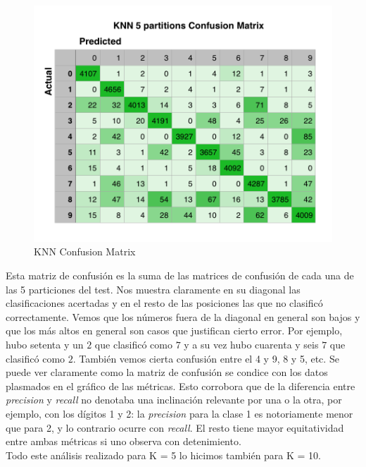 \begin{figure}[h!]
  \begin{center}
	\includegraphics[scale=0.7]{exp1/KNN-5p-Confusion.png}
	\caption{KNN Confusion Matrix}
  \end{center}
\end{figure}

Esta matriz de confusión es la suma de las matrices de confusión de cada una de las 5 particiones del test. Nos muestra claramente en su diagonal las clasificaciones acertadas y en el resto de las posiciones las que no clasificó correctamente. Vemos que los números fuera de la diagonal en general son bajos y que los más altos en general son casos que justifican cierto error. Por ejemplo, hubo setenta y un $2$ que clasificó como $7$ y a su vez hubo cuarenta y seis $7$ que clasificó como $2$. También vemos cierta confusión entre el 4 y 9, 8 y 5, etc. Se puede ver claramente como la matriz de confusi\'on se condice con los datos plasmados en el gr\'afico de las m\'etricas. Esto corrobora que de la diferencia entre \textit{precision} y \textit{recall} no denotaba una inclinaci\'on relevante por una o la otra, por ejemplo, con los d\'igitos 1 y 2: la \textit{precision} para la clase 1 es notoriamente menor que para 2, y lo contrario ocurre con \textit{recall}. El resto tiene mayor equitatividad entre ambas m\'etricas si uno observa con detenimiento. \\ 

Todo este análisis realizado para K = 5 lo hicimos también para K = 10. 

